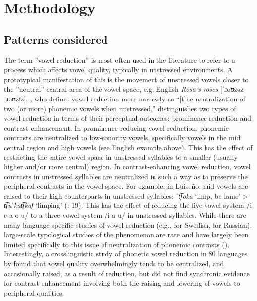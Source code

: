 \section{ Methodology}\label{sec:6.2}
\subsection{ Patterns considered}\label{sec:6.2.1}

  The term ”vowel reduction” is most often used in the literature to refer to a process which affects vowel quality, typically in unstressed environments. A prototypical manifestation of this is the movement of unstressed vowels closer to the ”neutral” central area of the vowel space, e.g. English \textit{Rosa’s roses} [\textit{ˈ}ɹoʊzəz \textit{ˈ}ɹoʊzɨz]. \citet[1]{Crosswhite2000}, who defines vowel reduction more narrowly as “[t]he neutralization of two (or more) phonemic vowels when unstressed,” distinguishes two types of vowel reduction in terms of their perceptual outcomes: prominence reduction and contrast enhancement. In prominence-reducing vowel reduction, phonemic contrasts are neutralized to low-sonority vowels, specifically vowels in the mid central region and high vowels (see English example above). This has the effect of restricting the entire vowel space in unstressed syllables to a smaller (usually higher and/or more central) region. In contrast-enhancing vowel reduction, vowel contrasts in unstressed syllables are neutralized in such a way as to preserve the peripheral contrasts in the vowel space. For example, in Luiseño, mid vowels are raised to their high counterparts in unstressed syllables: \textit{ˈt͡ʃoka} ‘limp, be lame’ > \textit{t͡ʃuˈkat͡ʃkaʃ} ‘limping’ (\citealt{MunroBenson1973}: 19). This has the effect of reducing the five-vowel system /i e a o u/ to a three-vowel system /i a u/ in unstressed syllables. While there are many language-specific studies of vowel reduction (e.g., \citealt{Lindblom1963} for Swedish, \citealt{PadgettTabain2005} for Russian), large-scale typological studies of the phenomenon are rare and have largely been limited specifically to this issue of neutralization of phonemic contrasts (\citealt{Crosswhite2001,Crosswhite2004,Barnes2006}). Interestingly, a crosslinguistic study of phonetic vowel reduction in 80 languages by \citet{KapatsinskiEtAl2019} found that vowel quality overwhelmingly tends to be centralized, and occasionally raised, as a result of reduction, but did not find synchronic evidence for contrast-enhancement involving both the raising and lowering of vowels to peripheral qualities.

